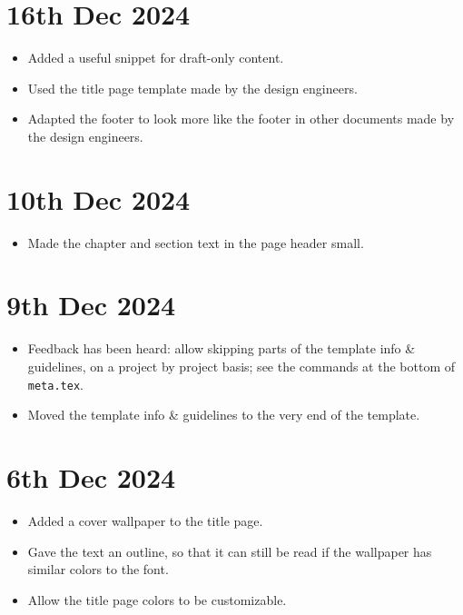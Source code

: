 
\section*{16th Dec 2024} \label{sec:changelog:2024/12/16}
\begin{itemize}
    \item Added a useful snippet for draft-only content.
    \item Used the title page template made by the design engineers.
    \item Adapted the footer to look more like the footer in other documents made by the design engineers.
\end{itemize}

\section*{10th Dec 2024} \label{sec:changelog:2024/12/10}
\begin{itemize}
    \item Made the chapter and section text in the page header small.
\end{itemize}

\section*{9th Dec 2024} \label{sec:changelog:2024/12/09}
\begin{itemize}
    \item Feedback has been heard: allow skipping parts of the template info \& guidelines, on a project by project basis; see the commands at the bottom of \verb|meta.tex|.
    \item Moved the template info \& guidelines to the very end of the template.
\end{itemize}

\section*{6th Dec 2024} \label{sec:changelog:2024/12/06}
\begin{itemize}
    \item Added a cover wallpaper to the title page.
    \item Gave the text an outline, so that it can still be read if the wallpaper has similar colors to the font.
    \item Allow the title page colors to be customizable.
\end{itemize}

